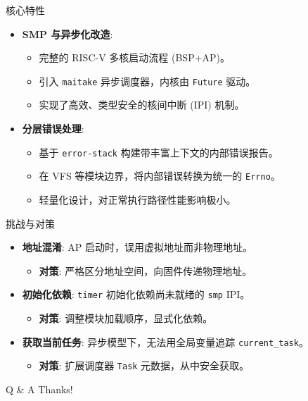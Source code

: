 \documentclass[
  ignorenonframetext,
]{beamer}
\providecommand{\tightlist}{%
  \setlength{\itemsep}{0pt}\setlength{\parskip}{0pt}}
\begin{document}
\begin{frame}[fragile]
\begin{block}{核心特性}
\label{ux6838ux5fc3ux7279ux6027}
\begin{itemize}
\tightlist
\item
  \textbf{SMP 与异步化改造}:

  \begin{itemize}
  \tightlist
  \item
    完整的 RISC-V 多核启动流程 (BSP+AP)。
  \item
    引入 \texttt{maitake} 异步调度器，内核由 \texttt{Future} 驱动。
  \item
    实现了高效、类型安全的核间中断 (IPI) 机制。
  \end{itemize}
\item
  \textbf{分层错误处理}:

  \begin{itemize}
  \tightlist
  \item
    基于 \texttt{error-stack} 构建带丰富上下文的内部错误报告。
  \item
    在 VFS 等模块边界，将内部错误转换为统一的 \texttt{Errno}。
  \item
    轻量化设计，对正常执行路径性能影响极小。
  \end{itemize}
\end{itemize}
\end{block}
\end{frame}

\begin{frame}[fragile]
\begin{block}{挑战与对策}
\label{ux6311ux6218ux4e0eux5bf9ux7b56}
\begin{itemize}
\tightlist
\item
  \textbf{地址混淆}: AP 启动时，误用虚拟地址而非物理地址。

  \begin{itemize}
  \tightlist
  \item
    \textbf{对策}: 严格区分地址空间，向固件传递物理地址。
  \end{itemize}
\item
  \textbf{初始化依赖}: \texttt{timer} 初始化依赖尚未就绪的 \texttt{smp}
  IPI。

  \begin{itemize}
  \tightlist
  \item
    \textbf{对策}: 调整模块加载顺序，显式化依赖。
  \end{itemize}
\item
  \textbf{获取当前任务}: 异步模型下，无法用全局变量追踪
  \texttt{current\_task}。

  \begin{itemize}
  \tightlist
  \item
    \textbf{对策}: 扩展调度器 \texttt{Task} 元数据，从中安全获取。
  \end{itemize}
\end{itemize}
\end{block}
\end{frame}

\begin{frame}{Q \& A}
\label{q-a}
Thanks!
\end{frame}
\end{document}
